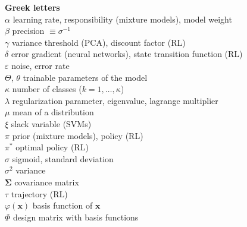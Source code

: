 \documentclass[12pt]{article}
\begin{document}
\begin{tabbing}
	\textbf{Greek letters} 																					\\[3mm]
	\> $\alpha$ 									\>	learning rate, responsibility (mixture models), model weight		\\[3mm]
	\> $\beta$										\>	precision $\equiv \sigma^{-1}$							\\[3mm]
	\> $\gamma$									\>	variance threshold (PCA), discount factor (RL)					\\[3mm]
	\> $\delta$									\>	error gradient (neural networks), state transition function (RL)		\\[3mm]
	\> $\varepsilon$									\>	noise, error rate										\\[3mm]
	\> $\Theta$, $\theta$								\>	trainable parameters of the model							\\[3mm]
	\> $\kappa$									\>	number of classes ($k = 1, \dots, \kappa$)					\\[3mm]
	\> $\lambda$									\>	regularization parameter, eigenvalue, lagrange multiplier			\\[3mm]
	\> $\mu$										\>	mean of a distribution									\\[3mm]
	\> $\xi$										\>	slack variable (SVMs)									\\[3mm]
	\> $\pi$										\>	prior (mixture models), policy (RL)							\\[3mm]
	\> $\pi^*$										\>	optimal policy (RL)									\\[3mm]
	\> $\sigma$									\>	sigmoid, standard deviation								\\[3mm]
	\> $\sigma^2$									\>	variance											\\[3mm]
	\> $\bm{\Sigma}$								\>	covariance matrix										\\[3mm]
	\> $\tau$										\>	trajectory (RL)										\\[3mm]
	\> $\varphi(\bm{x})$								\>	basis function of $\bm{x}$								\\[3mm]
	\> $\Phi$										\>	design matrix with basis functions							\\[10mm]
	

\end{tabbing}
\end{document}
